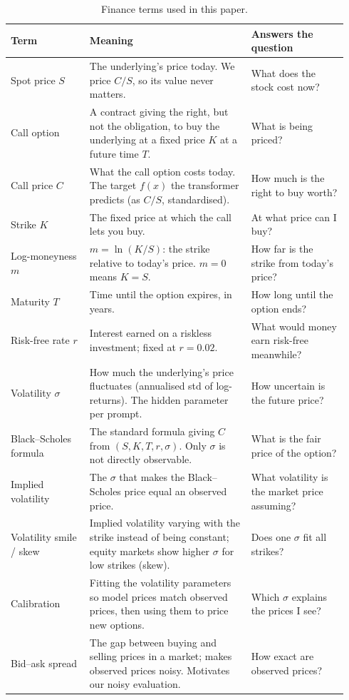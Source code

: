 \begin{table}[H]
    \caption{Finance terms used in this paper.}
    \label{tab:glossary}
    \centering
    \small
    \begin{tabular}{@{}p{0.22\linewidth} p{0.45\linewidth} p{0.27\linewidth}@{}}
      \toprule
      Term & Meaning & Answers the question \\
      \midrule
      Spot price $S$
        & The underlying's price today. We price $C/S$, so its value never matters.
        & What does the stock cost now? \\
      Call option
        & A contract giving the right, but not the obligation, to buy the underlying at a fixed price $K$ at a future time $T$.
        & What is being priced? \\
      Call price $C$
        & What the call option costs today. The target $f(x)$ the transformer predicts (as $C/S$, standardised).
        & How much is the right to buy worth? \\
      Strike $K$
        & The fixed price at which the call lets you buy.
        & At what price can I buy? \\
      Log-moneyness $m$
        & $m = \ln(K/S)$: the strike relative to today's price. $m = 0$ means $K = S$.
        & How far is the strike from today's price? \\
      Maturity $T$
        & Time until the option expires, in years.
        & How long until the option ends? \\
      Risk-free rate $r$
        & Interest earned on a riskless investment; fixed at $r = 0.02$.
        & What would money earn risk-free meanwhile? \\
      Volatility $\sigma$
        & How much the underlying's price fluctuates (annualised std of log-returns). The hidden parameter per prompt.
        & How uncertain is the future price? \\
      Black--Scholes formula
        & The standard formula giving $C$ from $(S, K, T, r, \sigma)$. Only $\sigma$ is not directly observable.
        & What is the fair price of the option? \\
      Implied volatility
        & The $\sigma$ that makes the Black--Scholes price equal an observed price.
        & What volatility is the market price assuming? \\
      Volatility smile / skew
        & Implied volatility varying with the strike instead of being constant; equity markets show higher $\sigma$ for low strikes (skew).
        & Does one $\sigma$ fit all strikes? \\
      Calibration
        & Fitting the volatility parameters so model prices match observed prices, then using them to price new options.
        & Which $\sigma$ explains the prices I see? \\
      Bid--ask spread
        & The gap between buying and selling prices in a market; makes observed prices noisy. Motivates our noisy evaluation.
        & How exact are observed prices? \\
      \bottomrule
    \end{tabular}
  \end{table}